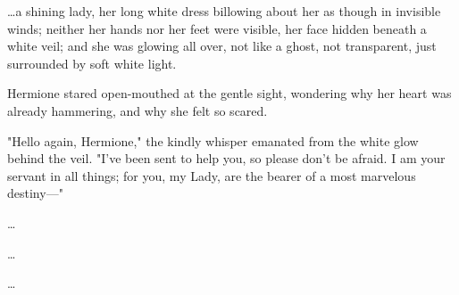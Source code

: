 {\ldots}a shining lady, her long white dress billowing about her as though in 
invisible winds; neither her hands nor her feet were visible, her face hidden 
beneath a white veil; and she was glowing all over, not like a ghost, not 
transparent, just surrounded by soft white light.

Hermione stared open-mouthed at the gentle sight, wondering why her heart was 
already hammering, and why she felt so scared.

"Hello again, Hermione," the kindly whisper emanated from the white glow behind 
the veil. "I've been sent to help you, so please don't be afraid. I am your 
servant in all things; for you, my Lady, are the bearer of a most marvelous 
destiny---"

\begin{center}
{\ldots}

{\ldots}

{\ldots}
\end{center}
